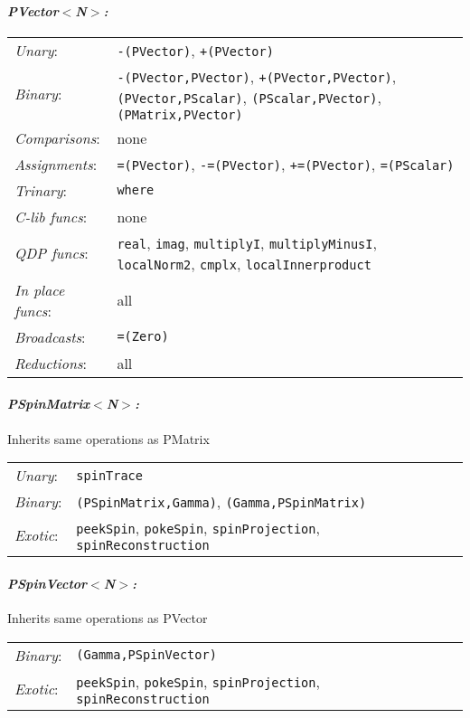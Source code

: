 \documentclass[12pt,letterpaper]{article}
\begin{document}
\paragraph{\bf\em PVector$<$N$>$:}
\begin{flushleft}
  \begin{tabular}{lp{5.0in}}
  {\em Unary}:& {\tt -(PVector)}, {\tt +(PVector)}\\
  {\em Binary}:& {\tt -(PVector,PVector)}, {\tt +(PVector,PVector)}, 
       {\tt *(PVector,PScalar)}, {\tt *(PScalar,PVector)}, {\tt *(PMatrix,PVector)}\\
  {\em Comparisons}:& none\\
  {\em Assignments}:& {\tt =(PVector)}, {\tt -=(PVector)}, {\tt +=(PVector)}, 
       {\tt *=(PScalar)}\\
  {\em Trinary}:& {\tt where}\\
  {\em C-lib funcs}:& none\\
  {\em QDP funcs}:& {\tt real}, {\tt imag}, {\tt multiplyI}, {\tt multiplyMinusI}, 
        {\tt localNorm2}, {\tt cmplx}, {\tt localInnerproduct}\\
  {\em In place funcs}:& all\\
  {\em Broadcasts}:& {\tt =(Zero)}\\
  {\em Reductions}:& all\\
  \end{tabular}
\end{flushleft}

\paragraph{\bf\em PSpinMatrix$<$N$>$:}
  Inherits same operations as PMatrix
\begin{flushleft}
  \begin{tabular}{lp{5.0in}}
  {\em Unary}:& {\tt spinTrace}\\
  {\em Binary}:& {\tt *(PSpinMatrix,Gamma)}, {\tt *(Gamma,PSpinMatrix)}\\
  {\em Exotic}:& {\tt peekSpin}, {\tt pokeSpin}, {\tt spinProjection}, 
      {\tt spinReconstruction}\\
  \end{tabular}
\end{flushleft}

\paragraph{\bf\em PSpinVector$<$N$>$:}
  Inherits same operations as PVector
\begin{flushleft}
  \begin{tabular}{lp{5.0in}}
  {\em Binary}:& {\tt *(Gamma,PSpinVector)}\\
  {\em Exotic}:& {\tt peekSpin}, {\tt pokeSpin}, {\tt spinProjection}, 
      {\tt spinReconstruction}\\
  \end{tabular}
\end{flushleft}
\end{document}
